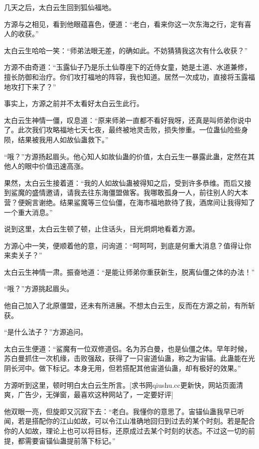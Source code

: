 
\begin{this_body}

几天之后，太白云生回到狐仙福地。

方源与之相见，看到他眼蕴喜色，便道：“老白，看来你这一次东海之行，定有喜人的收获。”

太白云生哈哈一笑：“师弟法眼无差，的确如此。不妨猜猜我这次有什么收获？”

方源不由奇道：“玉露仙子乃是乐土仙尊座下的近侍女童，她是土道、水道兼修，擅长防御和治疗。你们攻打福地的阵容，我也知道。居然一次成功，直接将玉露福地攻打下来了？”

事实上，方源之前并不太看好太白云生此行。

太白云生神情一僵，叹息道：“原来师弟一直都不看好我呀，还真是叫师弟你说中了。此次我们攻略福地七天七夜，最终被地灵击败，损失惨重。一位蛊仙险些身陨，结果被我用人如故仙蛊救下。”

“哦？”方源扬起眉头。他心知人如故仙蛊的价值，太白云生一暴露此蛊，定然在其他人的眼中价值迅速高涨。

果然，太白云生接着道：“我的人如故仙蛊被得知之后，受到许多恭维。而后又接到鲨魔的盛情邀请，请我去往东海僵盟做客。我哪敢孤身一人，前往别人的大本营？便婉言谢绝。结果鲨魔等三位仙僵，在海市福地款待了我，酒席间让我得知了一个重大消息。”

说到这里，太白云生顿了顿，止住话头，目光炯炯地看着方源。

方源心中一笑，便顺着他的意，问询道：“呵呵呵，到底是何重大消息？值得让你来卖关子？”

太白云生神情一肃。振奋地道：“是能让师弟你重获新生，脱离仙僵之体的办法！”

“哦？”方源挑起眉头。

他自己加入了北原僵盟，还未有所进展。不想太白云生，反而在方源之前，有所斩获。

“是什么法子？”方源追问。

太白云生便道：“鲨魔有一位双修道侣。名为苏白曼，也是仙僵之体。早年时候，苏白曼抓住一次机缘，击败强敌，获得了一只宙道仙蛊，称之为宙锚。此蛊能在光阴长河中。做下标记。本身无用，但若搭配其他宙道仙蛊，却有极好的效果。”

方源听到这里，顿时明白太白云生所言。[求书网qiushu.cc更新快，网站页面清爽，广告少，无弹窗，最喜欢这种网站了，一定要好评]

他双眼一亮，但旋即又沉寂下去：“老白。我懂你的意思了。宙锚仙蛊我早已听闻，若是搭配你的江山如故，可以令江山准确地回归到过去的某个时刻。若是配合你的人如故，理论上也可以将目标，还原成过去某个时刻的状态。不过这一切的前提，都需要宙锚仙蛊提前落下标记。”


\end{this_body}
